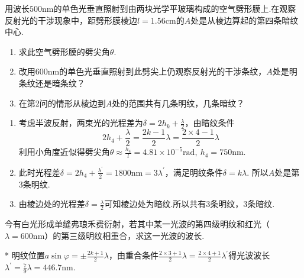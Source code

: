 {\begin{problem}[劈尖干涉][8]
    用波长$500\mathrm{nm}$的单色光垂直照射到由两块光学平玻璃构成的空气劈形膜上.在观察反射光的干涉现象中，距劈形膜棱边$l=1.56\mathrm{cm}$的$A$处是从棱边算起的第四条暗纹中心.
    \begin{enumerate}
        \item 求此空气劈形膜的劈尖角$\theta$.
        \item 改用$600\mathrm{nm}$的单色光垂直照射到此劈尖上仍观察反射光的干涉条纹，$A$处是明条纹还是暗条纹？
        \item 在第2问的情形从棱边到$A$处的范围共有几条明纹，几条暗纹？
    \end{enumerate}
\end{problem}
\begin{solution}
    \begin{enumerate}
        \item 考虑半波反射，两束光的光程差为$\delta=2h_k+\frac{\lambda}{2}$，由暗纹条件
        \[2h_4+\frac{\lambda}{2}=\frac{2k-1}{2}\lambda=\frac{2\times 4-1}{2}\lambda\]
        利用小角度近似得劈尖角$\theta\approx\frac{h_4}{l}=4.81\times 10^{-5}\mathrm{rad},\ h_4=750\mathrm{nm}$.
        \item 此时光程差$\delta=2h_4+\frac{\lambda^{\prime}}{2}=1800\mathrm{nm}=3\lambda^{\prime}$，满足明纹条件$\delta=k\lambda$. 所以$A$处是第3条明纹.
        \item 由棱边处的光程差$\delta=\frac{\lambda}{2}$可知棱边处为暗纹.所以共有$3$条明纹，$3$条暗纹.
    \end{enumerate}
\end{solution}

\begin{problem}[弗琅禾费衍射][6]
    今有白光形成单缝弗琅禾费衍射，若其中某一光波的第四级明纹和红光（$\lambda=600\mathrm{nm}$）的第三级明纹相重合，求这一光波的波长.
\end{problem}
\begin{solution}*
    明纹位置$a\sin{\varphi}=\pm\frac{2k+1}{2}\lambda$，由重合条件$\frac{2\times 3+1}{2}\lambda=\frac{2\times 4+1}{2}\lambda^{\prime}$得光波波长$\lambda^{\prime}=\frac{7}{9}\lambda=446.7\mathrm{nm}$.
\end{solution}
}